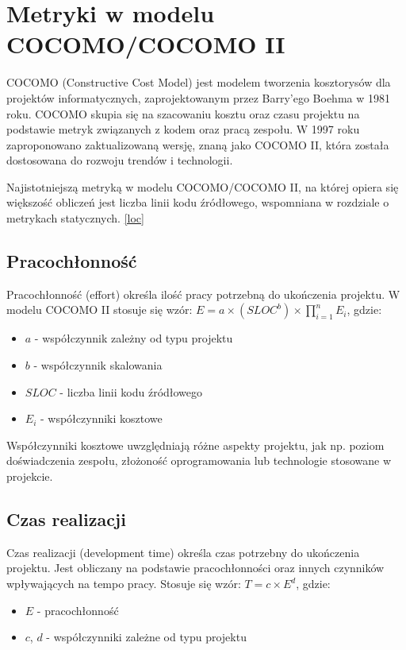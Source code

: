\section{Metryki w modelu COCOMO/COCOMO II}
COCOMO (Constructive Cost Model) jest modelem tworzenia kosztorysów dla projektów informatycznych, zaprojektowanym przez Barry'ego Boehma w 1981 roku. \cite[]{CocomoBoehm} COCOMO skupia się na szacowaniu kosztu oraz czasu projektu na podstawie metryk związanych z kodem oraz pracą zespołu.
W 1997 roku zaproponowano zaktualizowaną wersję, znaną jako COCOMO II, która została dostosowana do rozwoju trendów i technologii.

Najistotniejszą metryką w modelu COCOMO/COCOMO II, na której opiera się większość obliczeń jest liczba linii kodu źródłowego, wspomniana w rozdziale o metrykach statycznych. \ref{loc}

\subsection{Pracochłonność}
\label{cocomo:effort}
Pracochłonność (effort) określa ilość pracy potrzebną do ukończenia projektu. W modelu COCOMO II stosuje się wzór:
$E = a \times (SLOC^b) \times \prod_{i=1}^{n}E_i$,
gdzie:
\begin{itemize}
    \item $a$ - współczynnik zależny od typu projektu
    \item $b$ - współczynnik skalowania
    \item $SLOC$ - liczba linii kodu źródłowego
    \item $E_i$ - współczynniki kosztowe
\end{itemize}
Współczynniki kosztowe uwzględniają różne aspekty projektu, jak np. poziom doświadczenia zespołu, złożoność oprogramowania lub technologie stosowane w projekcie.

\subsection{Czas realizacji}
Czas realizacji (development time) określa czas potrzebny do ukończenia projektu. Jest obliczany na podstawie pracochłonności oraz innych czynników wpływających na tempo pracy. Stosuje się wzór:
$T = c \times E^d$,
gdzie:
\begin{itemize}
    \item $E$ - pracochłonność
    \item $c$, $d$ - współczynniki zależne od typu projektu
\end{itemize}
\newpage
